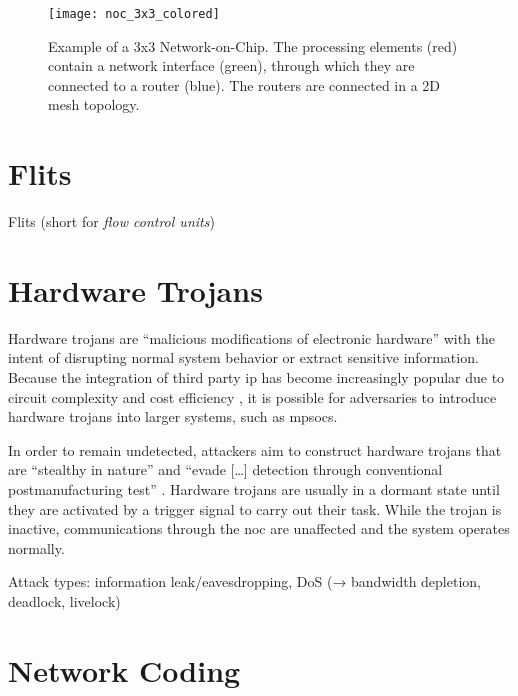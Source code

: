 \begin{figure}
    \centering
    \texttt{[image: noc\_3x3\_colored]}
    \caption[Example of a 3x3 NoC]{Example of a 3x3 Network-on-Chip. The processing elements (red) contain a network interface
    (green), through which they are connected to a router (blue). The routers are connected in a 2D mesh topology.}
    \label{fig:nocexample}
\end{figure}

\section{Flits}\label{sec:flits}
Flits (short for \textit{flow control units}) %

\section{Hardware Trojans}\label{sec:hardwaretrojans}
Hardware trojans are \enquote{malicious modifications of electronic hardware} \cite[1]{bhunia14hardwaretrojans} with the intent of disrupting normal
system behavior or extract sensitive information. Because the integration of third party \gls{ip} has become increasingly popular due to circuit
complexity and cost efficiency \cites[1]{ancajas14fortnocs}[2]{bhunia14hardwaretrojans}, it is possible for adversaries to introduce hardware
trojans into larger systems, such as \glspl{mpsoc}.

In order to remain undetected, attackers aim to construct hardware trojans that are \enquote{stealthy in nature} \cite[1]{bhunia14hardwaretrojans}
and \enquote{evade […] detection through conventional postmanufacturing test} \cite[1]{bhunia14hardwaretrojans}. Hardware trojans are usually in a
dormant state until they are activated by a trigger signal to carry out their task. \cites{bhunia14hardwaretrojans}{ancajas14fortnocs} While the
trojan is inactive, communications through the \gls{noc} are unaffected and the system operates normally.

Attack types: information leak/eavesdropping, DoS (→ bandwidth depletion, deadlock, livelock)

\section{Network Coding}\label{sec:networkcodingfun}
